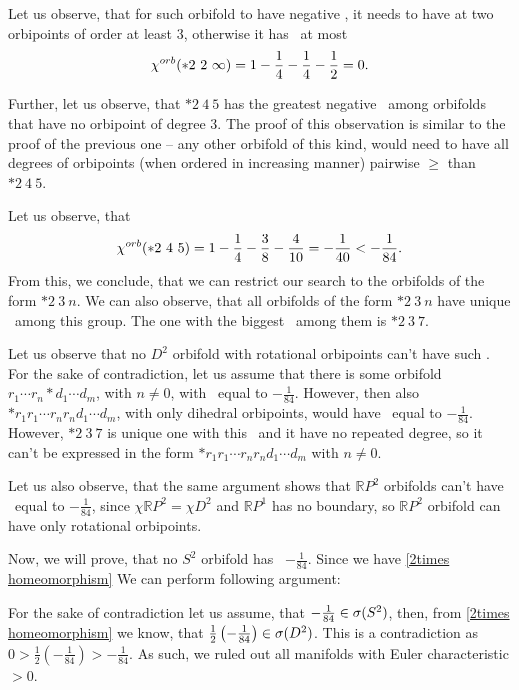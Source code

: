 Let us observe, that for such orbifold to have negative \Eoc, it needs to have at two orbipoints 
of order at least $3$, otherwise it has \Eoc\ at most 
\begin{equation}
\cho{*2\ 2\ \infty} = 1- \frac{1}{4} - \frac{1}{4} - \frac{1}{2} = 0. 
\end{equation}

Further, let us observe, that $*2\ 4\ 5$ has the greatest negative \Eoc\ among orbifolds 
that have no orbipoint of degree $3$. The proof of this observation is similar to the proof 
of the previous one -- any other orbifold of this kind, 
would need to have all degrees of orbipoints (when ordered in increasing manner) 
pairwise $\geq$ than $*2\ 4\ 5$.

Let us observe, that
\begin{equation}
{\chi^{orb}(*2\ 4\ 5)} = 1 - \frac{1}{4} - \frac{3}{8} - \frac{4}{10} = -\frac{1}{40} < - \frac{1}{84}. 
\end{equation}
From this, we conclude, that we can restrict our search to the orbifolds of 
the form $*2\ 3\ n$. 
We can also observe, that all orbifolds of the form $*2\ 3\ n$ have unique \Eoc\ 
among this group.
The one with the biggest \Eoc\ among them is $*2\ 3\ 7$. 

Let us observe that no $D^2$ orbifold with rotational orbipoints can't have such \Eoc. 
For the sake of contradiction, let us assume that there is some orbifold 
$r_1 \cdots r_n * d_1 \cdots d_m$, with $n\neq 0$, with \Eoc\ equal to $-\frac{1}{84}$. 
However, then also $*r_1r_1 \cdots r_nr_nd_1\cdots d_m$, 
with only dihedral orbipoints, 
would have \Eoc\ equal to $-\frac{1}{84}$. However, $*2\ 3\ 7$ is unique one with this \Eoc\ 
and it have no repeated degree, so it can't be expressed in the form 
$*r_1r_1 \cdots r_nr_nd_1\cdots d_m$ 
with $n\neq 0$. 

Let us also observe, that the same argument shows that $\mathbb{R}P^2$ orbifolds 
can't have \Eoc\ equal to $-\frac{1}{84}$, since $\chi{\mathbb{R}P^2} = \chi{D^2}$ 
and $\mathbb{R}P^1$ has no boundary, so $\mathbb{R}P^2$ orbifold can have only rotational 
orbipoints. 
 
Now, we will prove, that no $S^2$ orbifold has \Eoc\ $-\frac{1}{84}$. 
Since we have \ref{2times homeomorphism} 
We can perform following argument:  
 
For the sake of contradiction let us assume, that 
$-\frac{1}{84} \in {{\sigma}(S^2)}$, then, from \ref{2times homeomorphism} we know, that 
$\frac{1}{2}\left(-\frac{1}{84}\right)\in {{\sigma}(D^2)}$. This is a contradiction as 
$0 > \frac{1}{2}\left(-\frac{1}{84}\right) > -\frac{1}{84}$. 
As such, we ruled out all manifolds with Euler characteristic $>0$. 

